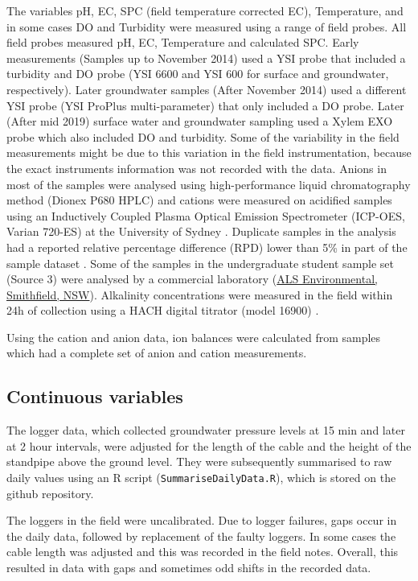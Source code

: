 \documentclass[, manuscript]{copernicus}
\begin{document}
The variables pH, EC, SPC (field temperature corrected EC), Temperature,
and in some cases DO and Turbidity were measured using a range of field
probes. All field probes measured pH, EC, Temperature and calculated
SPC. Early measurements (Samples up to November 2014) used a YSI probe
that included a turbidity and DO probe (YSI 6600 and YSI 600 for surface
and groundwater, respectively). Later groundwater samples (After
November 2014) used a different YSI probe (YSI ProPlus multi-parameter)
that only included a DO probe. Later (After mid 2019) surface water and
groundwater sampling used a Xylem EXO probe which also included DO and
turbidity. Some of the variability in the field measurements might be
due to this variation in the field instrumentation, because the exact
instruments information was not recorded with the data. Anions in most
of the samples were analysed using high-performance liquid
chromatography method (Dionex P680 HPLC) and cations were measured on
acidified samples using an Inductively Coupled Plasma Optical Emission
Spectrometer (ICP-OES, Varian 720-ES) at the University of Sydney
\citep{Akter2018}. Duplicate samples in the analysis had a reported
relative percentage difference (RPD) lower than 5\% in part of the
sample dataset \citep{Akter2018}. Some of the samples in the
undergraduate student sample set (Source 3) were analysed by a
commercial laboratory
(\href{https://www.alsglobal.com/en/locations/asia-pacific/pacific/australia/nsw/sydney-woodpark-environmental}{ALS
Environmental, Smithfield, NSW}). Alkalinity concentrations were
measured in the field within 24h of collection using a HACH digital
titrator (model 16900) \citep{Akter2018}.

Using the cation and anion data, ion balances were calculated from
samples which had a complete set of anion and cation measurements.

\subsection{Continuous variables}

The logger data, which collected groundwater pressure levels at 15 min
and later at 2 hour intervals, were adjusted for the length of the cable
and the height of the standpipe above the ground level. They were
subsequently summarised to raw daily values using an R script
(\texttt{SummariseDailyData.R}), which is stored on the github
repository.

The loggers in the field were uncalibrated. Due to logger failures, gaps
occur in the daily data, followed by replacement of the faulty loggers.
In some cases the cable length was adjusted and this was recorded in the
field notes. Overall, this resulted in data with gaps and sometimes odd
shifts in the recorded data.
\end{document}
